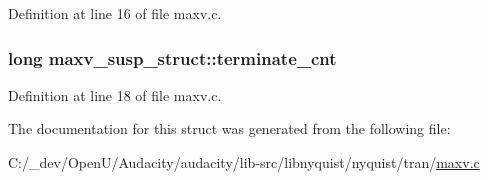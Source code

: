 Definition at line 16 of file maxv.\+c.

\subsubsection[{\texorpdfstring{terminate\+\_\+cnt}{terminate_cnt}}]{\setlength{\rightskip}{0pt plus 5cm}long maxv\+\_\+susp\+\_\+struct\+::terminate\+\_\+cnt}\hypertarget{structmaxv__susp__struct_a0a9e7c89da4d0a3014de4d2a0a3e1457}{}\label{structmaxv__susp__struct_a0a9e7c89da4d0a3014de4d2a0a3e1457}


Definition at line 18 of file maxv.\+c.



The documentation for this struct was generated from the following file\+:\begin{DoxyCompactItemize}
\item 
C\+:/\+\_\+dev/\+Open\+U/\+Audacity/audacity/lib-\/src/libnyquist/nyquist/tran/\hyperlink{maxv_8c}{maxv.\+c}\end{DoxyCompactItemize}
